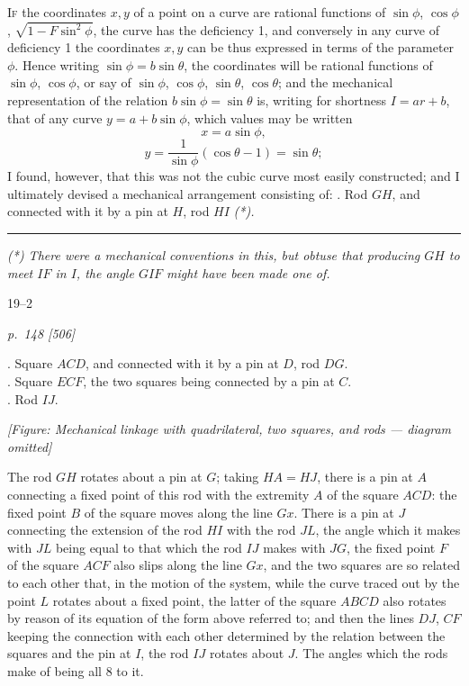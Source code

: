 \documentclass[11pt,a4paper]{book}
\begin{document}
\textsc{If} the coordinates $x, y$ of a point on a curve are rational functions of $\sin\phi$, $\cos\phi$,
$\sqrt{1 - F\sin^2\phi}$, the curve has the deficiency 1, and conversely in any curve of deficiency 1
the coordinates $x, y$ can be thus expressed in terms of the parameter $\phi$. Hence
writing $\sin\phi = b\sin\theta$, the coordinates will be rational functions of $\sin\phi$, $\cos\phi$,
or say of $\sin\phi$, $\cos\phi$, $\sin\theta$, $\cos\theta$; and the mechanical representation of the relation
$b\sin\phi = \sin\theta$ is, writing for shortness $I = ar + b$, that of any curve $y = a + b\sin\phi$,
which values may be written
\[
x = a\sin\phi,
\]
\[
y = \frac{1}{\sin\phi}(\cos\theta - 1) = \sin\theta;
\]
I found, however, that this was not the cubic curve most easily constructed; and I
ultimately devised a mechanical arrangement consisting of:
. Rod $GH$, and connected with it by a pin at $H$, rod $HI$ \textit{(*).}

\rule{0.5\textwidth}{0.4pt}\par\noindent
\textit{(*) There were a mechanical conventions in this, but obtuse that producing $GH$ to meet $IF$ in $I$, the angle $GIF$ might have been made one of.}

\hfill 19--2

\clearpage

\bigskip
\textit{p.~148 [506]}
\smallskip

\noindent
{}. Square $ACD$, and connected with it by a pin at $D$, rod $DG$.\\
. Square $ECF$, the two squares being connected by a pin at $C$.\\
. Rod $IJ$.

\begin{center}
\textit{[Figure: Mechanical linkage with quadrilateral, two squares, and rods --- diagram omitted]}
\end{center}

\noindent
The rod $GH$ rotates about a pin at $G$; taking $HA = HJ$, there is a pin at $A$
connecting a fixed point of this rod with the extremity $A$ of the square $ACD$: the
fixed point $B$ of the square moves along the line $Gx$. There is a pin at $J$ connecting
the extension of the rod $HI$ with the rod $JL$, the angle which it makes with $JL$ being
equal to that which the rod $IJ$ makes with $JG$, the fixed point $F$ of the square
$ACF$ also slips along the line $Gx$, and the two squares are so related to each other
that, in the motion of the system, while the curve traced out by the point $L$ rotates
about a fixed point, the latter of the square $ABCD$ also rotates by reason of its
equation of the form above referred to; and then the lines $DJ$, $CF$ keeping
the connection with each other determined by the relation between the squares and
the pin at $I$, the rod $IJ$ rotates about $J$. The angles which the rods make of being all 8 to it.
\end{document}
